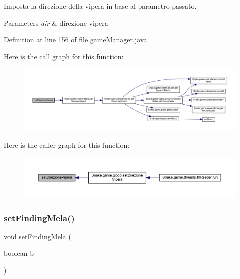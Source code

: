 Imposta la direzione della vipera in base al parametro passato. 


\begin{DoxyParams}{Parameters}
{\em dir} & direzione vipera \\
\hline
\end{DoxyParams}


Definition at line 156 of file game\+Manager.\+java.

Here is the call graph for this function\+:
\nopagebreak
\begin{figure}[H]
\begin{center}
\leavevmode
\includegraphics[width=350pt]{class_snake_1_1game_1_1utility_1_1game_manager_a6007259ace9d33bd56b9a6193e86df39_cgraph}
\end{center}
\end{figure}
Here is the caller graph for this function\+:
\nopagebreak
\begin{figure}[H]
\begin{center}
\leavevmode
\includegraphics[width=350pt]{class_snake_1_1game_1_1utility_1_1game_manager_a6007259ace9d33bd56b9a6193e86df39_icgraph}
\end{center}
\end{figure}
\mbox{\label{class_snake_1_1game_1_1utility_1_1game_manager_a169584b55e994918baf671fe1c741e39}} 
\subsubsection{\texorpdfstring{set\+Finding\+Mela()}{setFindingMela()}}
{\footnotesize\ttfamily void set\+Finding\+Mela (\begin{DoxyParamCaption}\item[{boolean}]{b }\end{DoxyParamCaption})}



